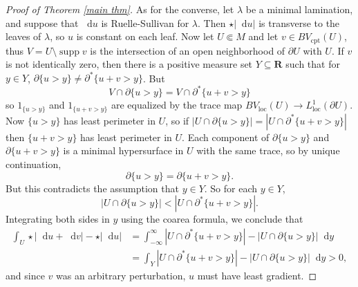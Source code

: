 \documentclass[reqno,11pt]{amsart}
\newcommand{\RR}{\mathbf{R}}
\DeclareMathOperator{\supp}{supp}
\newcommand*\dif{\mathop{}\!\mathrm{d}}
\newcommand{\loc}{\mathrm{loc}}
\newcommand{\cpt}{\mathrm{cpt}}
\theoremstyle{definition}
\numberwithin{equation}{section}
\begin{document}
\begin{proof}[Proof of Theorem \ref{main thm}]
As for the converse, let $\lambda$ be a minimal lamination, and suppose that $\dif u$ is Ruelle-Sullivan for $\lambda$.
Then $\star |\dif u|$ is transverse to the leaves of $\lambda$, so $u$ is constant on each leaf.
Now let $U \Subset M$ and let $v \in BV_\cpt(U)$, thus $V = U \setminus \supp v$ is the intersection of an open neighborhood of $\partial U$ with $U$.
If $v$ is not identically zero, then there is a positive measure set $Y \subseteq \RR$ such that for $y \in Y$, $\partial \{u > y\} \neq \partial^* \{u + v > y\}$.
But
$$V \cap \partial \{u > y\} = V \cap \partial^* \{u + v > y\}$$
so $1_{\{u > y\}}$ and $1_{\{u + v > y\}}$ are equalized by the trace map $BV_\loc(U) \to L^1_\loc(\partial U)$.
Now $\{u > y\}$ has least perimeter in $U$, so if $|U \cap \partial \{u > y\}| = |U \cap \partial^* \{u + v > y\}|$ then $\{u + v > y\}$ has least perimeter in $U$.
Each component of $\partial \{u > y\}$ and $\partial \{u + v > y\}$ is a minimal hypersurface in $U$ with the same trace, so by unique continuation,
$$\partial \{u > y\} = \partial \{u + v > y\}.$$
But this contradicts the assumption that $y \in Y$. So for each $y \in Y$,
$$|U \cap \partial \{u > y\}| < |U \cap \partial^* \{u + v > y\}|.$$
Integrating both sides in $y$ using the coarea formula, we conclude that
\begin{align*}
\int_U \star |\dif u + \dif v| - \star |\dif u| &= \int_{-\infty}^\infty |U \cap \partial^* \{u + v > y\}| - |U \cap \partial \{u > y\}| \dif y \\
&= \int_Y |U \cap \partial^* \{u + v > y\}| - |U \cap \partial \{u > y\}| \dif y > 0,
\end{align*}
and since $v$ was an arbitrary perturbation, $u$ must have least gradient.
\end{proof}


\printbibliography
\end{document}
